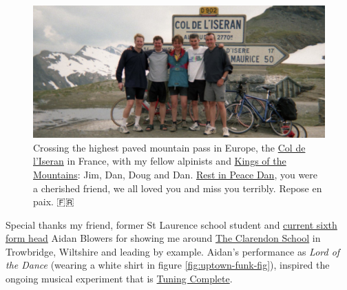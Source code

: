 \documentclass[
]{book}
\begin{document}
\begin{figure}

{\centering \includegraphics[width=1\linewidth]{images/kings-of-the-mountains-col-deliseran} 

}

\caption{Crossing the highest paved mountain pass in Europe, the \href{https://en.wikipedia.org/wiki/Col_de_l\%27Iseran}{Col de l'Iseran} in France, with my fellow alpinists and \href{https://en.wikipedia.org/wiki/King_of_the_Mountains}{Kings of the Mountains}: Jim, Dan, Doug and Dan. \href{https://www.wiltshiretimes.co.uk/announcements/deaths/deaths/14828732.Daniel_Feane/}{Rest in Peace Dan}, you were a cherished friend, we all loved you and miss you terribly. Repose en paix. 🇫🇷}\label{fig:bradlads-fig}
\end{figure}



Special thanks my friend, former St Laurence school student and \href{https://st-laurence.com/sixth-form}{current sixth form head} Aidan Blowers for showing me around \href{https://en.wikipedia.org/wiki/The_Clarendon_Academy}{The Clarendon School} in Trowbridge, Wiltshire and leading by example. Aidan's performance as \emph{Lord of the Dance} (wearing a white shirt in figure \ref{fig:uptown-funk-fig}), inspired the ongoing musical experiment that is \href{http://www.cs.man.ac.uk/~hulld/research.html\#tuningcomplete}{Tuning Complete}.
\end{document}
